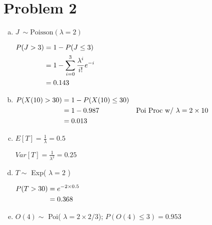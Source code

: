 \documentclass[11pt]{article}
\newenvironment{equ}{$\hfill\begin{aligned}[t]}{\end{aligned}\hfill \null$}
\begin{document}
\section*{Problem 2}
\begin{enumerate}[(a)]
	\item $J\ \sim \text{Poisson} ( \lambda = 2 )$

		\begin{equ}
			P( J > 3 ) &= 1 -P( J \leq 3 ) \\
			&= 1-\sum \limits _{i=0} ^{3} \dfrac{\lambda^i}{i!}e^{-i} \\
			&= 0.143
		\end{equ}

	\item
		\begin{equ}
			P( X(10) > 30 ) &= 1 - P( X(10) \leq 30 ) \\
			&= 1 - 0.987 & \text{Poi Proc w/ } \lambda=2 \times 10 \\
			&= 0.013
		\end{equ}

	\item $E[T] = \frac{1}{\lambda} = 0.5$

		$Var[T] = \frac{1}{\lambda ^2} = 0.25$

	\item $T \sim$ Exp( $\lambda = 2$ )

		\begin{equ} 
			P(T > 30) &= e^{-2 \times 0.5} \\
			&= 0.368
		\end{equ}

	\item $O(4) \sim$ Poi( $\lambda = 2 \times 2/3$); $P(O(4) \leq 3) = 0.953$


		
\end{enumerate}
\end{document}
